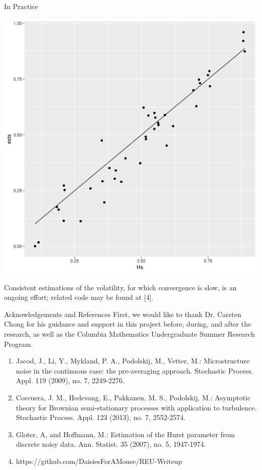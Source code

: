 \documentclass[final,hyperref={pdfpagelabels=false}]{beamer}
\begin{document}
\begin{frame}{}
\begin{columns}[t]
\begin{column}{0.28\linewidth}
\begin{block}{In Practice}
          \begin{center}
            \includegraphics[width=15cm]{./hests.png}
          \end{center}
          Consistent estimations of the volatility, for which convergence is slow, is an ongoing effort; related code may be found at [4].
        \end{block}
        \begin{block}{Acknowledgements and References}
          {\footnotesize
            First, we would like to thank Dr. Carsten Chong for his guidance and support in this project before, during, and after the research, as well as the Columbia Mathematics Undergraduate Summer Research Program.
          }{\tiny
          \begin{enumerate}
            \item Jacod, J., Li, Y., Mykland, P. A., Podolskij, M., Vetter, M.: Microstructure noise in the continuous case: the pre-averaging approach. Stochastic Process. Appl. 119 (2009), no. 7, 2249-2276.
            \item Corcuera, J. M., Hedevang, E., Pakkanen, M. S., Podolskij, M.: Asymptotic theory for Brownian semi-stationary processes with application to turbulence. Stochastic Process. Appl. 123 (2013), no. 7, 2552-2574.
            \item Gloter, A, and Hoffmann, M.: Estimation of the Hurst parameter from discrete noisy data. Ann. Statist. 35 (2007), no. 5, 1947-1974.
            \item https://github.com/DaisiesForAMouse/REU-Writeup
          \end{enumerate}
        }
        \end{block}
      \end{column}
    \end{columns}
  \end{frame}
\end{document}
